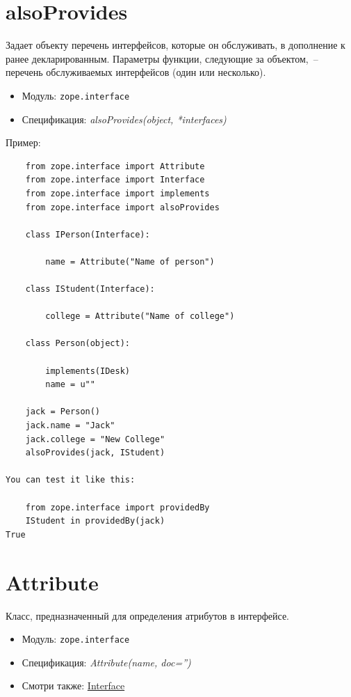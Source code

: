 \documentclass[a4paper,openany,twoside,final]{book}
\providecommand*{\DUroletitlereference}[1]{\textsl{#1}}
\begin{document}
\section*{alsoProvides%
  \label{alsoprovides}%
}

Задает объекту перечень интерфейсов, которые он обслуживать, в дополнение к ранее декларированным.  Параметры функции, следующие за объектом,~-- перечень обслуживаемых интерфейсов (один или несколько).

\begin{itemize}

\item Модуль: \texttt{zope.interface}

\item Спецификация: \DUroletitlereference{alsoProvides(object, *interfaces)}

\end{itemize}

Пример:

\begin{verbatim}
    from zope.interface import Attribute
    from zope.interface import Interface
    from zope.interface import implements
    from zope.interface import alsoProvides

    class IPerson(Interface):

        name = Attribute("Name of person")

    class IStudent(Interface):

        college = Attribute("Name of college")

    class Person(object):

        implements(IDesk)
        name = u""

    jack = Person()
    jack.name = "Jack"
    jack.college = "New College"
    alsoProvides(jack, IStudent)

You can test it like this:

    from zope.interface import providedBy
    IStudent in providedBy(jack)
True
\end{verbatim}


\section*{Attribute%
  \label{attribute}%
}

Класс, предназначенный для определения атрибутов в интерфейсе.

\begin{itemize}

\item Модуль: \texttt{zope.interface}

\item Спецификация: \DUroletitlereference{Attribute(name, doc='')}

\item Смотри также: \hyperref[interface]{Interface}

\end{itemize}
\end{document}
